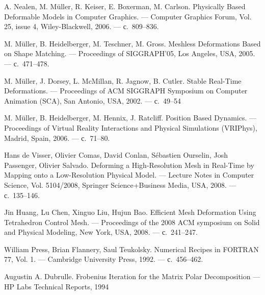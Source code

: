 \documentclass[a4paper,11pt]{report}
\begin{document}
  \begin{thebibliography}{99}

      A. Nealen, M. Müller, R. Keiser, E. Boxerman, M. Carlson.
      \newblock Physically Based Deformable Models in Computer Graphics.
      \newblock --- Computer Graphics Forum, Vol. 25, issue 4, Wiley-Blackwell, 2006.
      \newblock --- с.~809--836.

      M. Müller, B. Heidelberger, M. Teschner, M. Gross.
      \newblock Meshless Deformations Based on Shape Matching.
      \newblock --- Proceedings of SIGGRAPH'05, Los Angeles, USA, 2005.
      \newblock --- с.~471--478.

      M. Müller, J. Dorsey, L. McMillan, R. Jagnow, B. Cutler.
      \newblock Stable Real-Time Deformations.
      \newblock --- Proceedings of ACM SIGGRAPH Symposium on Computer Animation (SCA), San Antonio,
                    USA, 2002.
      \newblock --- с.~49--54

      M. Müller, B. Heidelberger, M. Hennix, J. Ratcliff.
      \newblock Position Based Dynamics.
      \newblock --- Proceedings of Virtual Reality Interactions and Physical Simulations (VRIPhys),
                    Madrid, Spain, 2006.
      \newblock --- с.~71--80.

      Hans de Visser, Olivier Comas, David Conlan, Sébastien Ourselin, Josh Passenger, Olivier Salvado.
      \newblock Deforming a High-Resolution Mesh in Real-Time by Mapping onto a Low-Resolution Physical Model.
      \newblock --- Lecture Notes in Computer Science, Vol. 5104/2008, Springer Science+Business Media,
                    USA, 2008.
      \newblock --- с.~135--146.

      Jin Huang, Lu Chen, Xinguo Liu, Hujun Bao.
      \newblock Efficient Mesh Deformation Using Tetrahedron Control Mesh.
      \newblock --- Proceedings of the 2008 ACM symposium on Solid and Physical Modeling, New York,
                    USA, 2008.
      \newblock --- с.~241--247.

      William Press, Brian Flannery, Saul Teukolsky.
      \newblock Numerical Recipes in FORTRAN 77, Vol. 1.
      \newblock --- Cambridge University Press, 1992.
      \newblock --- с.~456--462.

      Augustin A. Dubrulle.
      \newblock Frobenius Iteration for the Matrix Polar Decomposition
      \newblock --- HP Labs Technical Reports, 1994


\end{thebibliography}
\end{document}
